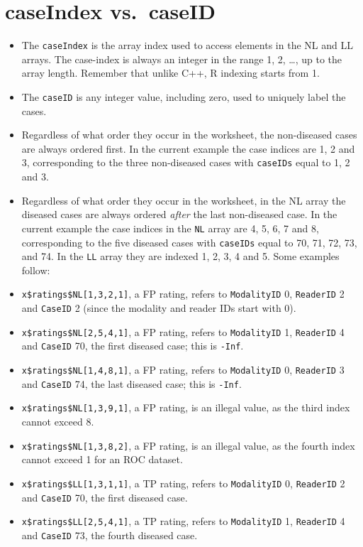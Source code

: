 \documentclass[
]{book}
\providecommand{\tightlist}{%
  \setlength{\itemsep}{0pt}\setlength{\parskip}{0pt}}
\begin{document}
\hypertarget{quick-start-read-datafile-correspondence-case-index-vs-case-id}{%
\section{caseIndex vs.~caseID}\label{quick-start-read-datafile-correspondence-case-index-vs-case-id}}

\begin{itemize}
\tightlist
\item
  The \texttt{caseIndex} is the array index used to access elements in the NL and LL arrays. The case-index is always an integer in the range 1, 2, \ldots, up to the array length. Remember that unlike C++, R indexing starts from 1.
\item
  The \texttt{caseID} is any integer value, including zero, used to uniquely label the cases.
\item
  Regardless of what order they occur in the worksheet, the non-diseased cases are always ordered first. In the current example the case indices are 1, 2 and 3, corresponding to the three non-diseased cases with \texttt{caseIDs} equal to 1, 2 and 3.
\item
  Regardless of what order they occur in the worksheet, in the NL array the diseased cases are always ordered \emph{after} the last non-diseased case. In the current example the case indices in the \texttt{NL} array are 4, 5, 6, 7 and 8, corresponding to the five diseased cases with \texttt{caseIDs} equal to 70, 71, 72, 73, and 74. In the \texttt{LL} array they are indexed 1, 2, 3, 4 and 5. Some examples follow:
\item
  \texttt{x\$ratings\$NL{[}1,3,2,1{]}}, a FP rating, refers to \texttt{ModalityID} 0, \texttt{ReaderID} 2 and \texttt{CaseID} 2 (since the modality and reader IDs start with 0).
\item
  \texttt{x\$ratings\$NL{[}2,5,4,1{]}}, a FP rating, refers to \texttt{ModalityID} 1, \texttt{ReaderID} 4 and \texttt{CaseID} 70, the first diseased case; this is \texttt{-Inf}.
\item
  \texttt{x\$ratings\$NL{[}1,4,8,1{]}}, a FP rating, refers to \texttt{ModalityID} 0, \texttt{ReaderID} 3 and \texttt{CaseID} 74, the last diseased case; this is \texttt{-Inf}.
\item
  \texttt{x\$ratings\$NL{[}1,3,9,1{]}}, a FP rating, is an illegal value, as the third index cannot exceed 8.
\item
  \texttt{x\$ratings\$NL{[}1,3,8,2{]}}, a FP rating, is an illegal value, as the fourth index cannot exceed 1 for an ROC dataset.
\item
  \texttt{x\$ratings\$LL{[}1,3,1,1{]}}, a TP rating, refers to \texttt{ModalityID} 0, \texttt{ReaderID} 2 and \texttt{CaseID} 70, the first diseased case.
\item
  \texttt{x\$ratings\$LL{[}2,5,4,1{]}}, a TP rating, refers to \texttt{ModalityID} 1, \texttt{ReaderID} 4 and \texttt{CaseID} 73, the fourth diseased case.
\end{itemize}
\end{document}
